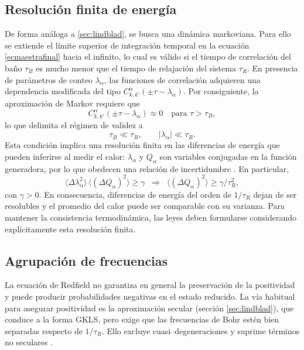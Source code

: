 \subsection{Resolución finita de energía}

De forma análoga a \ref{sec:lindblad}, se busca una dinámica markoviana. Para ello se extiende el límite superior de integración temporal en la ecuación \eqref{ecmaestrafinal} hacia el infinito, lo cual es válido si el tiempo de correlación del baño \(\tau_{B}\) es mucho menor que el tiempo de relajación del sistema \(\tau_{R}\). En presencia de parámetros de conteo \(\lambda_{\alpha}\), las funciones de correlación adquieren una dependencia modificada del tipo \(C^{\alpha}_{k,k'}(\pm \tau-\lambda_{\alpha})\). Por consiguiente, la aproximación de Markov requiere que
\[
    C^{\alpha}_{k,k'}(\pm \tau-\lambda_{\alpha}) \approx 0 
    \quad \text{para } \tau>\tau_{B},
\]
lo que delimita el régimen de validez a
\[
    \tau_{B}\ll \tau_{R},
    \qquad 
    |\lambda_{\alpha}|\ll \tau_{R}.
\]
Esta condición implica una resolución finita en las diferencias de energía que pueden inferirse al medir el calor: \(\lambda_{\alpha}\) y \(Q_{\alpha}\) son variables conjugadas en la función generadora, por lo que obedecen una relación de incertidumbre \cite{folland1997uncertainty}. En particular,
\[
    \langle \Delta \lambda^{2}_{\alpha} \rangle\,\langle (\Delta Q_{\alpha})^{2}\rangle \ge \gamma
    \;\;\Rightarrow\;\;
    \langle (\Delta Q_{\alpha})^{2}\rangle \ge \gamma/\tau_{R}^{2},
\]
con \(\gamma>0\). En consecuencia, diferencias de energía del orden de \(1/\tau_{R}\) dejan de ser resolubles y el promedio del calor puede ser comparable con su varianza. Para mantener la consistencia termodinámica, las leyes deben formularse considerando explícitamente esta resolución finita.
\label{sec2:finiteresol}

\subsection{Agrupación de frecuencias}

La ecuación de Redfield no garantiza en general la preservación de la positividad y puede producir probabilidades negativas en el estado reducido. La vía habitual para asegurar positividad es la aproximación secular (sección \ref{sec:lindblad}), que conduce a la forma GKLS, pero exige que las frecuencias de Bohr estén bien separadas respecto de \(1/\tau_{R}\). Ello excluye cuasi–degeneraciones y suprime términos no seculares \cite{trushechkin2021unified}.
\\

